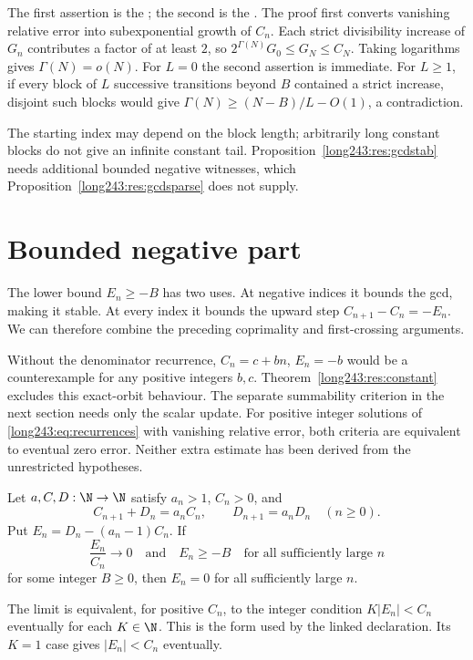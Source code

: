 \noindent The first assertion is the
; the second is the
. The proof first converts vanishing relative
error into subexponential growth of $C_n$. Each strict divisibility increase
of $G_n$ contributes a factor of at least $2$, so
$2^{\Gamma(N)}G_0\le G_N\le C_N$. Taking logarithms gives
$\Gamma(N)=o(N)$. For $L=0$ the second assertion is immediate.
For $L\ge1$, if every block of $L$ successive transitions beyond $B$
contained a strict increase, disjoint such blocks would give
$\Gamma(N)\ge(N-B)/L-O(1)$, a contradiction.

The starting index may depend on the block length; arbitrarily long
constant blocks do not give an infinite constant tail.
Proposition~\ref{long243:res:gcdstab} needs additional bounded negative
witnesses, which Proposition~\ref{long243:res:gcdsparse} does not supply.

\section{Bounded negative part}\label{long243:sec:bounded}

The lower bound $E_n\ge-B$ has two uses. At negative indices it
bounds the gcd, making it stable. At every index it bounds the upward
step $C_{n+1}-C_n=-E_n$. We can therefore combine the preceding
coprimality and first-crossing arguments.

Without the denominator recurrence, $C_n=c+bn$, $E_n=-b$ would be
a counterexample for any positive integers $b,c$.
Theorem~\ref{long243:res:constant} excludes this exact-orbit behaviour.
The separate summability criterion in the next section needs only the
scalar update. For positive integer solutions of \eqref{long243:eq:recurrences} with vanishing relative error,
both criteria are equivalent to eventual zero error. Neither extra
estimate has been derived from the unrestricted hypotheses.

\begin{theorem}\label{long243:res:bounded}
Let $a,C,D:\N\to\N$ satisfy $a_n>1$, $C_n>0$, and
\[
 C_{n+1}+D_n=a_nC_n,\qquad D_{n+1}=a_nD_n
 \quad(n\ge0).
\]
Put $E_n=D_n-(a_n-1)C_n$. If
\[
 \frac{E_n}{C_n}\longrightarrow0
 \quad\text{and}\quad E_n\ge-B\quad\text{for all sufficiently large }n
\]
for some integer $B\ge0$, then $E_n=0$ for all sufficiently large $n$.
\end{theorem}
The limit is equivalent, for positive $C_n$, to the integer condition
$K|E_n|<C_n$ eventually for each $K\in\N$. This is the form used
by the linked declaration. Its $K=1$ case gives $|E_n|<C_n$ eventually.


